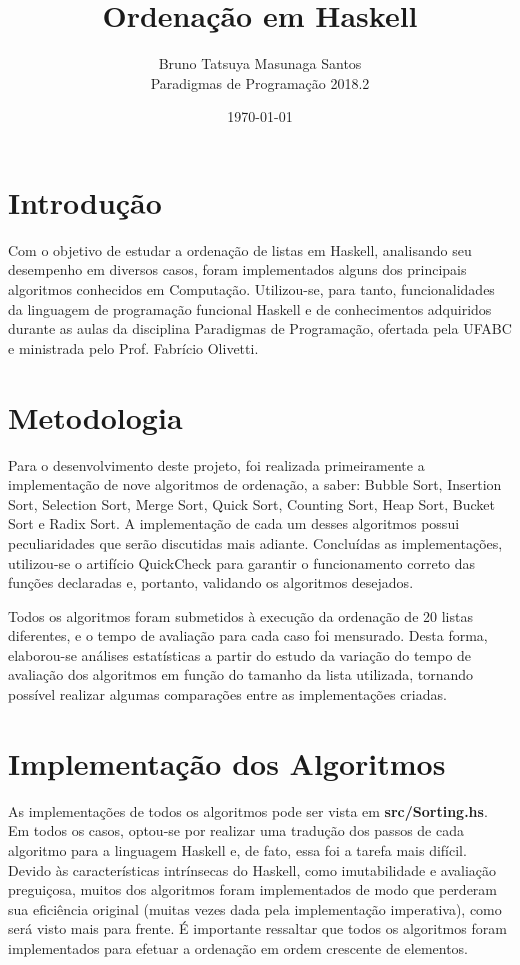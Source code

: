 \documentclass[12pt,a4paper]{article}
\title{Ordenação em Haskell}
\author{Bruno Tatsuya Masunaga Santos\\
        Paradigmas de Programação 2018.2}
\date{\today}
\begin{document}
\maketitle

\section{Introdução}
Com o objetivo de estudar a ordenação de listas em Haskell, analisando seu desempenho em diversos casos, foram implementados alguns dos principais algoritmos conhecidos em Computação. Utilizou-se, para tanto, funcionalidades da linguagem de programação funcional Haskell e de conhecimentos adquiridos durante as aulas da disciplina Paradigmas de Programação, ofertada pela UFABC e ministrada pelo Prof. Fabrício Olivetti. 

\section{Metodologia}
Para o desenvolvimento deste projeto, foi realizada primeiramente a implementação de nove algoritmos de ordenação, a saber: Bubble Sort, Insertion Sort, Selection Sort, Merge Sort, Quick Sort, Counting Sort, Heap Sort, Bucket Sort e Radix Sort. A implementação de cada um desses algoritmos possui peculiaridades que serão discutidas mais adiante. Concluídas as implementações, utilizou-se o artifício QuickCheck para garantir o funcionamento correto das funções declaradas e, portanto, validando os algoritmos desejados.

Todos os algoritmos foram submetidos à execução da ordenação de 20 listas diferentes, e o tempo de avaliação para cada caso foi mensurado. Desta forma, elaborou-se análises estatísticas a partir do estudo da variação do tempo de avaliação dos algoritmos em função do tamanho da lista utilizada, tornando possível realizar algumas comparações entre as implementações criadas.

\section{Implementação dos Algoritmos}
As implementações de todos os algoritmos pode ser vista em \textbf{src/Sorting.hs}. Em todos os casos, optou-se por realizar uma tradução dos passos de cada algoritmo para a linguagem Haskell e, de fato, essa foi a tarefa mais difícil. Devido às características intrínsecas do Haskell, como imutabilidade e avaliação preguiçosa, muitos dos algoritmos foram implementados de modo que perderam sua eficiência original (muitas vezes dada pela implementação imperativa), como será visto mais para frente. É importante ressaltar que todos os algoritmos foram implementados para efetuar a ordenação em ordem crescente de elementos.
\end{document}
